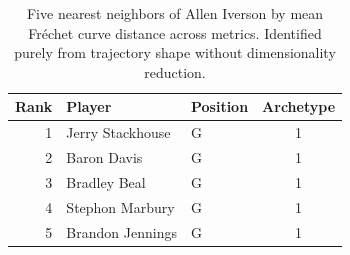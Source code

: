 \begin{table}[htbp]
  \centering\small
  \begin{tabular}{rllc}
    \toprule
    Rank & Player & Position & Archetype \\
    \midrule
    1 & Jerry Stackhouse & G & 1 \\
    2 & Baron Davis & G & 1 \\
    3 & Bradley Beal & G & 1 \\
    4 & Stephon Marbury & G & 1 \\
    5 & Brandon Jennings & G & 1 \\
    \bottomrule
  \end{tabular}
  \caption{Five nearest neighbors of Allen Iverson by mean Fr\'{e}chet curve distance across metrics. Identified purely from trajectory shape without dimensionality reduction.}
  \label{tab:Allen_Iverson_frechet_curve_neighbors}
\end{table}

